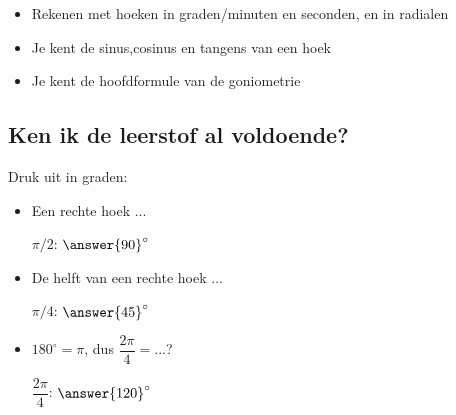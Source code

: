 \documentclass{ximera}
\begin{document}
\begin{foldable}
	\begin{itemize}
		\item Rekenen met hoeken in graden/minuten en seconden, en in radialen
		\item Je kent de sinus,cosinus en tangens van een hoek
		\item Je kent de hoofdformule van de goniometrie
	\end{itemize}
\end{foldable}

\subsection{Ken ik de leerstof al voldoende?}
\begin{foldable}
		  Druk uit in graden:
		  \begin{itemize}
	              \item 
			\begin{problem}
				\begin{hint} Een rechte hoek ... \end{hint}
				$\pi/2$: $\answer{90}^\circ$
			\end{problem}
	              \item 
			\begin{problem}
				\begin{hint} De helft van een rechte hoek ... \end{hint}
				$\pi/4$: $\answer{45}^\circ$
			\end{problem}
		      \item 
			\begin{problem}
				\begin{hint} $180^\circ = \pi$, dus $\dfrac{2\pi}{4} = ...$?\end{hint}
				$\dfrac{2\pi}{4}$: $\answer{120}^\circ$
			\end{problem}
		  \end{itemize}
\end{foldable}
\end{document}
